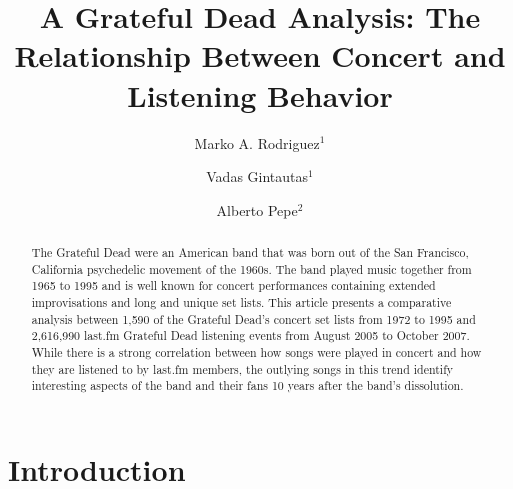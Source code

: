 \documentclass{svmult}
\begin{document}
\title*{A Grateful Dead Analysis: The Relationship Between Concert and Listening Behavior}
\author{Marko A. Rodriguez$^1$ \and Vadas Gintautas$^1$ \and Alberto Pepe$^2$}


\maketitle

\begin{abstract}
The Grateful Dead were an American band that was born out of the San Francisco, California psychedelic movement of the 1960s. The band played music together from 1965 to 1995 and is well known for concert performances containing extended improvisations and long and unique set lists. This article presents a comparative analysis between 1,590 of the Grateful Dead's concert set lists from 1972 to 1995 and 2,616,990 last.fm Grateful Dead listening events from August 2005 to October 2007. While there is a strong correlation between how songs were played in concert and how they are listened to by last.fm members, the outlying songs in this trend identify interesting aspects of the band and their fans 10 years after the band's dissolution.
\end{abstract}

\section{Introduction}
\end{document}
